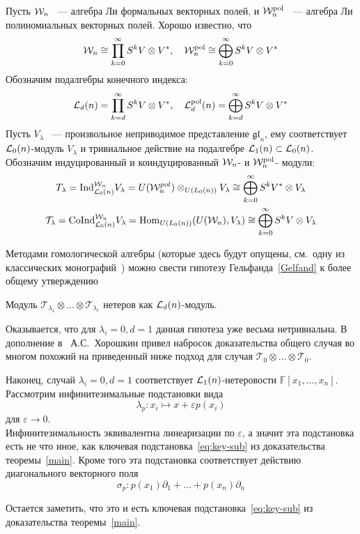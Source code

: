 Пусть $\mathcal{W}_n$ ~--- алгебра Ли формальных векторных полей, и $\mathcal{W}^{\mathrm{pol}}_n$ ~--- алгебра Ли полиномиальных векторных полей.
Хорошо известно, что
\[
    \mathcal{W}_n \cong \prod\limits_{k=0}^{\infty} S^k V\otimes V^*, \quad \mathcal{W}^{\mathrm{pol}}_n \cong \bigoplus\limits_{k=0}^{\infty} S^k V\otimes V^*
\]
Обозначим подалгебры конечного индекса:
\[
    \mathcal{L}_d(n) = \prod\limits_{k=d}^{\infty} S^k V\otimes V^*, \quad \mathcal{L}^{\mathrm{pol}}_d(n) = \bigoplus\limits_{k=d}^{\infty} S^k V\otimes V^*
\]
Пусть $V_{\lambda}$ ~--- произвольное неприводимое представление $\mathfrak{gl}_n$, ему соответствует $\mathcal{L}_0(n)$-модуль $V_{\lambda}$ и тривиальное действие на подалгебре $\mathcal{L}_1(n)\subset\mathcal{L}_0(n)$.
Обозначим индуцированный и коиндуцированный $\mathcal{W}_n$- и $\mathcal{W}^{\mathrm{pol}}_n$- модули:
\begin{gather*}
    T_{\lambda} = \mathrm{Ind}^{\mathcal{W}_n}_{\mathcal{L}_0(n)} V_{\lambda} = U(\mathcal{W}_n^{pol}) \otimes_{U(L_0(n))} V_{\lambda} \cong \bigoplus_{k=0}^{\infty} S^k V^*\otimes V_{\lambda} \\
    \mathcal{T}_{\lambda} = \mathrm{CoInd}^{\mathcal{W}_n}_{\mathcal{L}_0(n)} V_{\lambda} = \operatorname{Hom}_{U(L_0(n))}(U(\mathcal{W}_n), V_{\lambda}) \cong \bigoplus_{k=0}^{\infty} S^k V\otimes V_{\lambda}
\end{gather*}

Методами гомологической алгебры (которые здесь будут опущены, см.\ одну из классических монографий~\cite{Fuks}) можно свести гипотезу Гельфанда~\ref{Gelfand} к более общему утверждению

\vskip 0.1in\noindent
\begin{conjecture}
    Модуль $\mathcal{T}_{\lambda_1}\otimes\ldots\otimes\mathcal{T}_{\lambda_r}$ нетеров как $\mathcal{L}_d(n)$-модуль.
\end{conjecture}
\vskip 0.1in\noindent

Оказывается, что для $\lambda_i=0, d=1$ данная гипотеза уже весьма нетривиальна.
В дополнение в~\cite{Feigin-Kanel-Khoroshkin} А.С.\ Хорошкин привел набросок доказательства общего случая во многом похожий на приведенный ниже подход для случая $\mathcal{T}_{0}\otimes\ldots\otimes\mathcal{T}_{0}$.

Наконец, случай $\lambda_i=0, d=1$ соответствует $\mathcal{L}_1(n)$-нетеровости $\mathbb{F}[x_1, \ldots, x_n]$.
Рассмотрим инфинитезимальные подстановки вида
\[
    \lambda_p: x_i \mapsto x + \varepsilon p(x_i)
\]
для $\varepsilon\to 0$.\\
Инфинитезимальность эквивалентна линеаризации по $\varepsilon$, а значит эта подстановка есть не что иное, как ключевая подстановка~\ref{eq:key-sub} из доказательства теоремы~\ref{main}.
Кроме того эта подстановка соответствует действию диагонального векторного поля
\[
    \sigma_p: p(x_1)\partial_1 + \ldots + p(x_n)\partial_n
\]

Остается заметить, что это и есть ключевая подстановка~\ref{eq:key-sub} из доказательства теоремы~\ref{main}.
